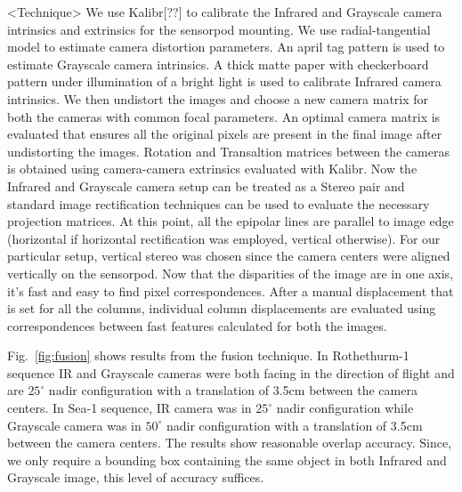 \documentclass[runningheads]{llncs}
\begin{document}
<Technique>
We use Kalibr[??] to calibrate the Infrared and Grayscale camera intrinsics and extrinsics for the sensorpod mounting. We use radial-tangential model to estimate camera distortion parameters. An april tag pattern is used to estimate Grayscale camera intrinsics. A thick matte paper with checkerboard pattern under illumination of a bright light is used to calibrate Infrared camera intrinsics. We then undistort the images and choose a new camera matrix for both the cameras with common focal parameters. An optimal camera matrix is evaluated that ensures all the original pixels are present in the final image after undistorting the images. Rotation and Transaltion matrices between the cameras is obtained using camera-camera extrinsics evaluated with Kalibr. Now the Infrared and Grayscale camera setup can be treated as a Stereo pair and standard image rectification techniques can be used to evaluate the necessary projection matrices. At this point, all the epipolar lines are parallel to image edge (horizontal if horizontal rectification was employed, vertical otherwise). For our particular setup, vertical stereo was chosen since the camera centers were aligned vertically on the sensorpod. Now that the disparities of the image are in one axis, it's fast and easy to find pixel correspondences. After a manual displacement that is set for all the columns, individual column displacements are evaluated using correspondences between fast features calculated for both the images.


Fig.~\ref{fig:fusion} shows results from the fusion technique. In Rothethurm-1 sequence IR and Grayscale cameras were both facing in the direction of flight and are $25^{\circ}$ nadir configuration with a translation of 3.5cm between the camera centers. In Sea-1 sequence, IR camera was in $25^{\circ}$ nadir configuration while Grayscale camera was in $50^{\circ}$ nadir configuration with a translation of 3.5cm between the camera centers. The results show reasonable overlap accuracy. Since, we only require a bounding box containing the same object in both Infrared and Grayscale image, this level of accuracy suffices.
\end{document}
